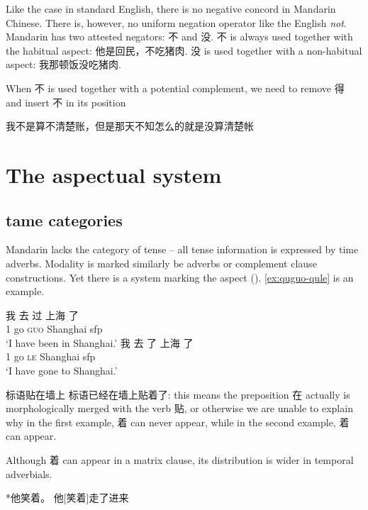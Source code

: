 \documentclass[UTF8, a4paper, oneside, scheme=plain, 12pt]{ctexrep}
\newcommand{\asis}[1]{\textsc{#1}}
\newcommand{\translate}[1]{`#1'}
\begin{document}
Like the case in standard English, 
there is no negative concord in Mandarin Chinese.
There is, however, no uniform negation operator like the English \emph{not}. 
Mandarin has two attested negators: 不 and 没.
不 is always used together with the habitual aspect:
他是回民，不吃猪肉.
没 is used together with a non-habitual aspect:
我那顿饭没吃猪肉.

When 不 is used together with a potential complement, 
we need to remove 得 and insert 不 in its position

我不是算不清楚账，但是那天不知怎么的就是没算清楚帐

\section{The aspectual system}\label{sec:aspectual}

\subsection{\acs{tame} categories}

Mandarin lacks the category of tense -- 
all tense information is expressed by time adverbs.
Modality is marked similarly be adverbs or complement clause constructions.
Yet there is a system marking the aspect (). 
\eqref{ex:quguo-qule} is an example.

\begin{exe}
    \ex \begin{xlist}
        \ex \gll 我 去 过 上海 了 \\
        1 go \asis{guo} Shanghai \acs{sfp} \\
        \glt \translate{I have been in Shanghai.}
        \ex \gll 我 去 了 上海 了 \\
        1 go \asis{le} Shanghai \acs{sfp} \\
        \glt \translate{I have gone to Shanghai.}
    \end{xlist}
    \label{ex:quguo-qule}
\end{exe}

标语贴在墙上 标语已经在墙上贴着了: 
this means the preposition 在 actually is morphologically merged with the verb 贴, 
or otherwise we are unable to explain why 
in the first example, 着 can never appear, 
while in the second example, 着 can appear.

Although 着 can appear in a matrix clause, 
its distribution is wider in temporal adverbials. 

*他笑着。
他[笑着]走了进来
\end{document}
